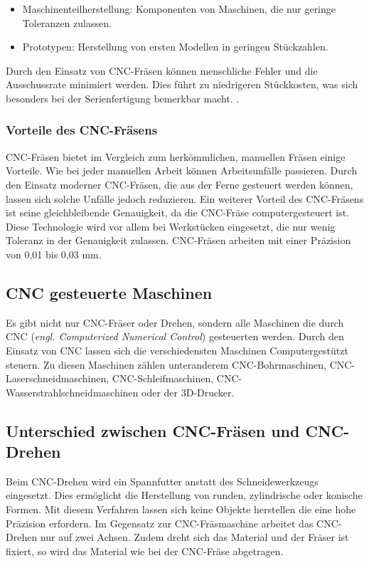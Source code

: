 \begin{itemize}
	\item Maschinenteilherstellung: Komponenten von Maschinen, die nur geringe Toleranzen zulassen.
	\item Prototypen: Herstellung von ersten Modellen in geringen Stückzahlen.
\end{itemize}

Durch den Einsatz von CNC-Fräsen können menschliche Fehler und die Ausschussrate minimiert werden. Dies führt zu niedrigeren Stückkosten, was sich besonders bei der Serienfertigung bemerkbar macht. \cite{CNC-Fräsen_2} \cite{CNC-Fräsen_3}.

\subsubsection{Vorteile des CNC-Fräsens}
CNC-Fräsen bietet im Vergleich zum herkömmlichen, manuellen Fräsen einige Vorteile. Wie bei jeder manuellen Arbeit können Arbeitsunfälle passieren. Durch den Einsatz moderner CNC-Fräsen, die aus der Ferne gesteuert werden können, lassen sich solche Unfälle jedoch reduzieren. Ein weiterer Vorteil des CNC-Fräsens ist seine gleichbleibende Genauigkeit, da die CNC-Fräse computergesteuert ist. Diese Technologie wird vor allem bei Werkstücken eingesetzt, die nur wenig Toleranz in der Genauigkeit zulassen. CNC-Fräsen arbeiten mit einer Präzision von 0,01 bis 0,03 mm.
\cite{CNC-Fräsen_Vorteile}

\subsection{CNC gesteuerte Maschinen}
Es gibt nicht nur CNC-Fräser oder Drehen, sondern alle Maschinen die durch CNC (\emph{engl. Computerized Numerical Control}) gesteuerten werden. Durch den Einsatz von CNC lassen sich die verschiedensten Maschinen Computergestützt steuern. Zu diesen Maschinen zählen unteranderem CNC-Bohrmaschinen,  CNC-Laserschneidmaschinen, CNC-Schleifmaschinen, CNC-Wasserstrahlschneidmaschinen oder der 3D-Drucker.
\cite{Arten_CNC_Maschinen}

\subsection{Unterschied zwischen CNC-Fräsen und CNC-Drehen}
Beim CNC-Drehen wird ein Spannfutter anstatt des Schneidewerkzeugs eingesetzt. Dies ermöglicht die Herstellung von runden, zylindrische oder konische Formen. Mit diesem Verfahren lassen sich keine Objekte herstellen die eine hohe Präzision erfordern. Im Gegensatz zur CNC-Fräsmaschine arbeitet das CNC-Drehen nur auf zwei Achsen. Zudem dreht sich das Material und der Fräser ist fixiert, so wird das Material wie bei der CNC-Fräse abgetragen.
\cite{CNC-Drehen_Unterschied}


